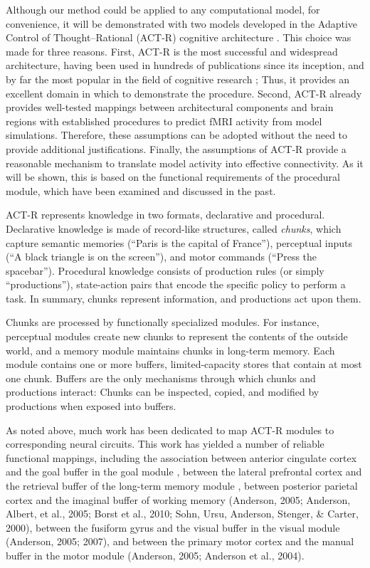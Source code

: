 \documentclass[10pt,letterpaper]{article}
\begin{document}
Although our method could be applied to any computational model, for convenience, it will be demonstrated with two models developed in the Adaptive Control of Thought--Rational (ACT-R) cognitive architecture \cite{Anderson2004}. This choice was made for three reasons.  First, ACT-R is the most successful and widespread architecture, having been used in hundreds of publications since its inception, and by far the most popular in the field of cognitive research \cite{Kotseruba2018}; Thus, it provides an excellent domain in which to demonstrate the procedure. Second, ACT-R already provides well-tested mappings between architectural components and brain regions with established procedures to predict fMRI activity from model simulations. Therefore, these assumptions can be adopted without the need to provide additional justifications. Finally, the assumptions of ACT-R provide a reasonable mechanism to translate model activity into effective connectivity. As it will be shown, this is based on the functional requirements of the procedural module, which have been examined and discussed in the past.

ACT-R represents knowledge in two formats, declarative and procedural. Declarative knowledge is made of record-like structures, called {\it chunks}, which capture semantic memories (“Paris is the capital of France”), perceptual inputs (“A black triangle is on the screen”), and motor commands (“Press the spacebar”). Procedural knowledge consists of production rules (or simply ``productions''), state-action pairs that encode the specific policy to perform a task. In summary, chunks represent information, and productions act upon them.

Chunks are processed by functionally specialized modules. For instance, perceptual modules create new chunks to represent the contents of the outside world, and a memory module maintains chunks in long-term memory. Each module contains one or more buffers, limited-capacity stores that contain at most one chunk. Buffers are the only mechanisms through which chunks and productions interact: Chunks can be inspected, copied, and modified by productions when exposed into buffers. 

As noted above, much work has been dedicated to map ACT-R modules to corresponding neural circuits. This work has yielded a number of reliable functional mappings, including the association between anterior cingulate cortex and the goal buffer in the goal module \cite{fincham2006distinct,sohn2007anticipation}, between the lateral prefrontal cortex and the retrieval buffer of the long-term memory module \cite{fincham2006distinct,danker2008rational}, between posterior parietal cortex and the imaginal buffer of working memory (Anderson, 2005; Anderson, Albert, et al., 2005; Borst et al., 2010; Sohn, Ursu, Anderson, Stenger, & Carter, 2000), between the fusiform gyrus and the visual buffer in the visual module (Anderson, 2005; 2007), and between the primary motor cortex and the manual buffer in the motor module (Anderson, 2005; Anderson et al., 2004).
\end{document}
